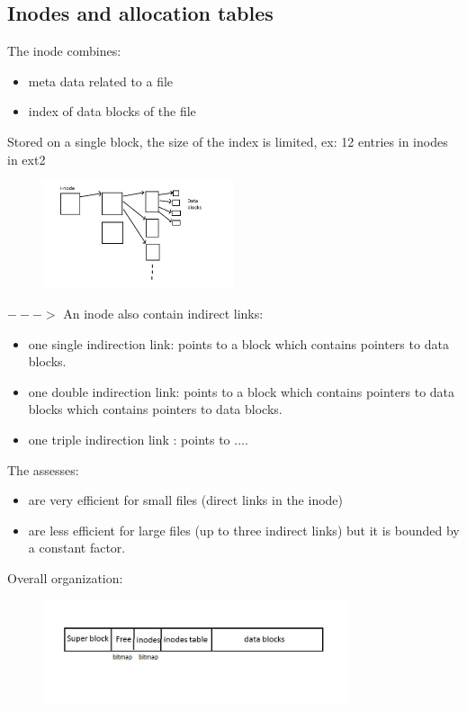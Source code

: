 \subsection{Inodes and allocation tables}

The inode combines:
\begin{itemize}
  \item meta data related to a file
  \item index of data blocks of the file
\end{itemize}

Stored on a single block, the size of the index is limited, ex: 12 entries in inodes in ext2

\begin{figure}[h!]
  \begin{center}
    \includegraphics[width=0.5\textwidth]{inode.jpg}
  \end{center}
\end{figure}

$--->$ An inode also contain indirect links:
\begin{itemize}
  \item one single indirection link: points to a block which contains pointers to data blocks.

  \item one double indirection link: points to a block which contains pointers to data blocks which contains pointers to data blocks.
  \item one triple indirection link : points to ....
  
\end{itemize}

The assesses:
\begin{itemize}
  \item are very efficient for small files (direct links in the inode)
  \item are less efficient for large files (up to three indirect links) but it is bounded by a constant factor.
\end{itemize}

Overall organization:

 \begin{figure}[h!]
  \begin{center}
    \includegraphics[width=0.8\textwidth]{inode_2.jpg}
  \end{center}
\end{figure}

